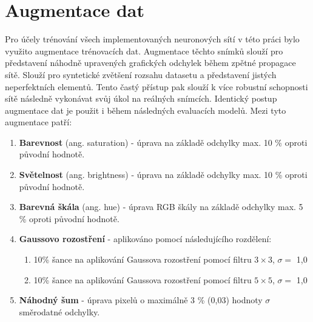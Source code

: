 \section{Augmentace dat}
\label{sec:Chapter41}
Pro účely trénování všech implementovaných neuronových sítí v této práci bylo využito augmentace trénovacích dat. Augmentace těchto snímků slouží pro představení náhodně upravených grafických odchylek během zpětné propagace sítě. Slouží pro syntetické zvětšení rozsahu datasetu a představení jistých neperfektních elementů. Tento častý přístup pak slouží k více robustní schopnosti sítě následně vykonávat svůj úkol na reálných snímcích. Identický postup augmentace dat je použit i během následných evaluacích modelů. Mezi tyto augmentace patří:
\begin{enumerate}
  \item \textbf{Barevnost} (ang. saturation) - úprava na základě odchylky max. 10 \% oproti původní hodnotě.
  \item \textbf{Světelnost} (ang. brightness) - úprava na základě odchylky max. 10 \% oproti původní hodnotě.
  \item \textbf{Barevná škála} (ang. hue) - úprava RGB škály na základě odchylky max. 5 \% oproti původní hodnotě.
  \item \textbf{Gaussovo rozostření} - aplikováno pomocí následujícího rozdělení:
  \begin{enumerate}
      \item 10\% šance na aplikování Gaussova rozostření pomocí filtru $3\times3$, $\sigma=$ 1,0
      \item 10\% šance na aplikování Gaussova rozostření pomocí filtru $5\times5$, $\sigma=$ 1,0
  \end{enumerate}
  \item \textbf{Náhodný šum} - úprava pixelů o maximálně 3 \% (0,03) hodnoty $\sigma$ směrodatné odchylky.
\end{enumerate}
\endinput